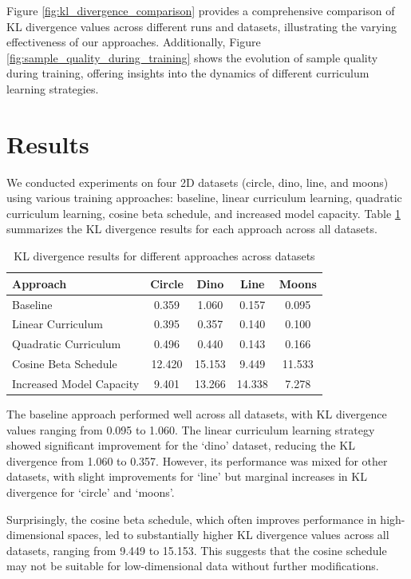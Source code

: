 \documentclass{article} %
\begin{document}
Figure \ref{fig:kl_divergence_comparison} provides a comprehensive comparison of KL divergence values across different runs and datasets, illustrating the varying effectiveness of our approaches. Additionally, Figure \ref{fig:sample_quality_during_training} shows the evolution of sample quality during training, offering insights into the dynamics of different curriculum learning strategies.

\section{Results}
\label{sec:results}

We conducted experiments on four 2D datasets (circle, dino, line, and moons) using various training approaches: baseline, linear curriculum learning, quadratic curriculum learning, cosine beta schedule, and increased model capacity. Table \ref{tab:kl_divergence} summarizes the KL divergence results for each approach across all datasets.

\begin{table}[h]
\centering
\caption{KL divergence results for different approaches across datasets}
\label{tab:kl_divergence}
\begin{tabular}{lcccc}
\toprule
Approach & Circle & Dino & Line & Moons \\
\midrule
Baseline & 0.359 & 1.060 & 0.157 & 0.095 \\
Linear Curriculum & 0.395 & 0.357 & 0.140 & 0.100 \\
Quadratic Curriculum & 0.496 & 0.440 & 0.143 & 0.166 \\
Cosine Beta Schedule & 12.420 & 15.153 & 9.449 & 11.533 \\
Increased Model Capacity & 9.401 & 13.266 & 14.338 & 7.278 \\
\bottomrule
\end{tabular}
\end{table}

The baseline approach performed well across all datasets, with KL divergence values ranging from 0.095 to 1.060. The linear curriculum learning strategy showed significant improvement for the `dino' dataset, reducing the KL divergence from 1.060 to 0.357. However, its performance was mixed for other datasets, with slight improvements for `line' but marginal increases in KL divergence for `circle' and `moons'.

Surprisingly, the cosine beta schedule, which often improves performance in high-dimensional spaces, led to substantially higher KL divergence values across all datasets, ranging from 9.449 to 15.153. This suggests that the cosine schedule may not be suitable for low-dimensional data without further modifications.
\end{document}
